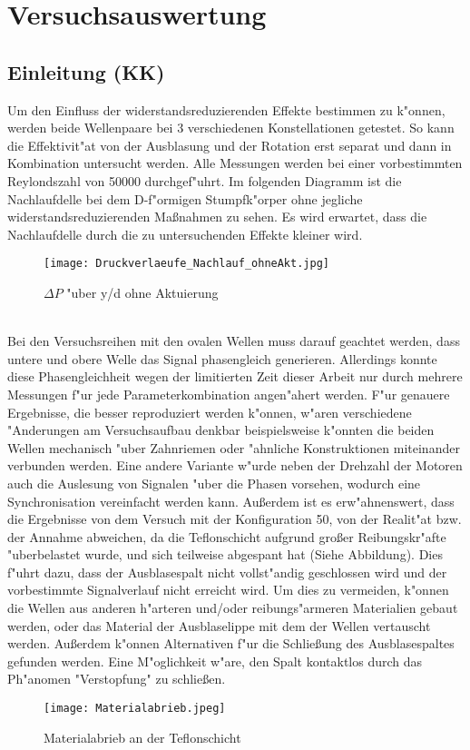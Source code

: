 \chapter{Versuchsauswertung}
\label{s:auswertung}
\section{Einleitung (KK)}
\label{s:einleitungAusw}
Um den Einfluss der widerstandsreduzierenden Effekte bestimmen zu k"onnen, werden beide Wellenpaare bei 3  verschiedenen Konstellationen getestet. So kann die Effektivit"at von der Ausblasung und der Rotation erst separat und dann in Kombination untersucht werden.
Alle Messungen werden bei einer vorbestimmten Reylondszahl von 50000 durchgef"uhrt.
Im folgenden Diagramm ist die Nachlaufdelle bei dem D-f"ormigen Stumpfk"orper ohne jegliche widerstandsreduzierenden Ma\ss{}nahmen zu sehen. 
Es wird erwartet, dass die Nachlaufdelle durch die zu untersuchenden Effekte kleiner wird.
\begin{figure}[h]
	\centering
	\texttt{[image: Druckverlaeufe\_Nachlauf\_ohneAkt.jpg]}
	\caption{ $\Delta P$ "uber y/d ohne Aktuierung }
	\label{fig:Deltap-y/d_ohne_Aktuation}
\end{figure}
\\
Bei den Versuchsreihen mit den ovalen Wellen muss darauf geachtet werden, dass untere und obere Welle das Signal phasengleich generieren. Allerdings konnte diese Phasengleichheit wegen der limitierten Zeit dieser Arbeit nur durch mehrere Messungen f"ur jede Parameterkombination angen"ahert werden.
F"ur genauere Ergebnisse, die besser reproduziert werden k"onnen, w"aren verschiedene "Anderungen am Versuchsaufbau denkbar beispielsweise k"onnten die beiden Wellen mechanisch "uber Zahnriemen oder "ahnliche Konstruktionen  miteinander verbunden werden. Eine andere Variante w"urde neben der Drehzahl der Motoren auch die Auslesung von Signalen "uber die Phasen  vorsehen, wodurch eine Synchronisation vereinfacht werden kann.
Au\ss{}erdem ist es erw"ahnenswert, dass die Ergebnisse von dem Versuch mit der Konfiguration 50, von der Realit"at bzw. der Annahme abweichen, da die Teflonschicht aufgrund
gro\ss{}er Reibungskr"afte "uberbelastet wurde, und sich teilweise abgespant hat (Siehe Abbildung).
Dies f"uhrt dazu, dass der Ausblasespalt nicht vollst"andig geschlossen wird und der vorbestimmte Signalverlauf nicht erreicht wird.
Um dies zu vermeiden, k"onnen die Wellen aus anderen h"arteren und/oder reibungs"armeren Materialien gebaut werden, oder das Material der Ausblaselippe mit dem der Wellen vertauscht werden. Au\ss{}erdem k"onnen Alternativen f"ur die Schlie\ss{}ung des Ausblasespaltes gefunden werden. Eine M"oglichkeit w"are, den Spalt kontaktlos durch das Ph"anomen "Verstopfung" zu schlie\ss{}en.
\begin{figure}[h]
	\centering
	\texttt{[image: Materialabrieb.jpeg]}
	\caption{ Materialabrieb an der Teflonschicht }
	\label{fig:Materialabrieb}
\end{figure}



